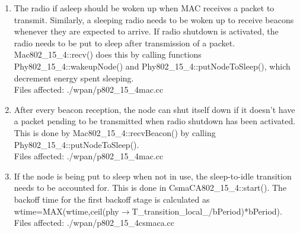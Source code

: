 \begin{enumerate}
\item{The radio if asleep should be woken up when MAC receives a packet to
transmit. Similarly, a sleeping radio needs to be woken up to
receive beacons whenever they are expected to arrive. If radio
shutdown is activated, the radio needs to be put to sleep after
transmission of a packet. \mbox{Mac802\_15\_4::recv()} does this by
calling functions \mbox{Phy802\_15\_4::wakeupNode()} and
\mbox{Phy802\_15\_4::putNodeToSleep()}, which decrement energy spent sleeping.\\
Files affected: ./wpan/p802\_15\_4mac.cc}

\item{After every beacon reception, the node can shut itself down if it doesn't
have a packet pending to be transmitted when radio shutdown has been
activated. This is done by \mbox{Mac802\_15\_4::recvBeacon()} by
calling \mbox{Phy802\_15\_4::putNodeToSleep()}.\\
Files affected:  ./wpan/p802\_15\_4mac.cc}

\item{If the node is being put to sleep when not in use, the sleep-to-idle transition
needs to be accounted for. This is done in \mbox{CsmaCA802\_15\_4::start()}. The backoff time 
for the first backoff stage is calculated as \mbox{wtime=MAX(wtime,ceil(phy$\rightarrow$T\_transition\_local\_/bPeriod)*bPeriod)}.\\
Files affected:  ./wpan/p802\_15\_4csmaca.cc}

\end{enumerate}

